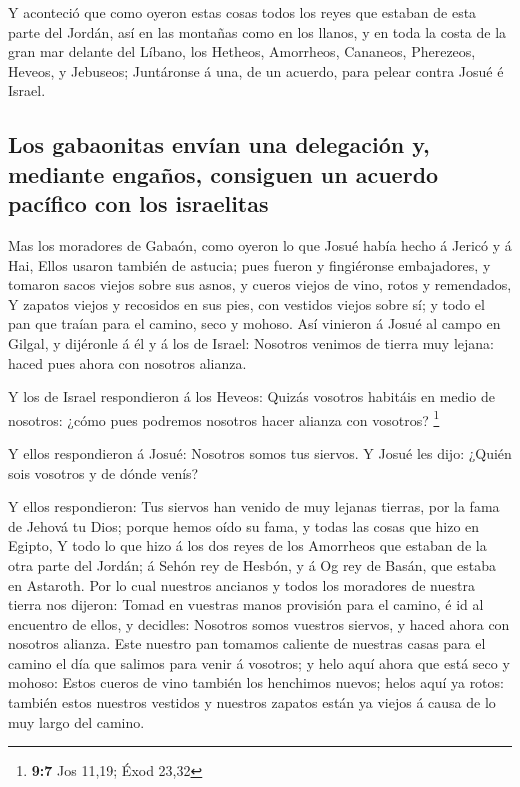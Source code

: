  Y aconteció que como oyeron estas cosas todos los reyes que
estaban de esta parte del Jordán, así en las montañas como en los
llanos, y en toda la costa de la gran mar delante del Líbano, los
Hetheos, Amorrheos, Cananeos, Pherezeos, Heveos, y Jebuseos;
 Juntáronse á una, de un acuerdo, para pelear contra Josué é
Israel.

\hypertarget{los-gabaonitas-envuxedan-una-delegaciuxf3n-y-mediante-engauxf1os-consiguen-un-acuerdo-pacuxedfico-con-los-israelitas}{%
\subsection{Los gabaonitas envían una delegación y, mediante engaños,
consiguen un acuerdo pacífico con los
israelitas}\label{los-gabaonitas-envuxedan-una-delegaciuxf3n-y-mediante-engauxf1os-consiguen-un-acuerdo-pacuxedfico-con-los-israelitas}}

 Mas los moradores de Gabaón, como oyeron lo que Josué había
hecho á Jericó y á Hai,  Ellos usaron también de astucia;
pues fueron y fingiéronse embajadores, y tomaron sacos viejos sobre sus
asnos, y cueros viejos de vino, rotos y remendados,  Y
zapatos viejos y recosidos en sus pies, con vestidos viejos sobre sí; y
todo el pan que traían para el camino, seco y mohoso.  Así
vinieron á Josué al campo en Gilgal, y dijéronle á él y á los de Israel:
Nosotros venimos de tierra muy lejana: haced pues ahora con nosotros
alianza.

 Y los de Israel respondieron á los Heveos: Quizás vosotros
habitáis en medio de nosotros: ¿cómo pues podremos nosotros hacer
alianza con vosotros? \footnote{\textbf{9:7} Jos 11,19; Éxod 23,32}

 Y ellos respondieron á Josué: Nosotros somos tus siervos. Y
Josué les dijo: ¿Quién sois vosotros y de dónde venís?

 Y ellos respondieron: Tus siervos han venido de muy lejanas
tierras, por la fama de Jehová tu Dios; porque hemos oído su fama, y
todas las cosas que hizo en Egipto,  Y todo lo que hizo á
los dos reyes de los Amorrheos que estaban de la otra parte del Jordán;
á Sehón rey de Hesbón, y á Og rey de Basán, que estaba en Astaroth.
 Por lo cual nuestros ancianos y todos los moradores de
nuestra tierra nos dijeron: Tomad en vuestras manos provisión para el
camino, é id al encuentro de ellos, y decidles: Nosotros somos vuestros
siervos, y haced ahora con nosotros alianza.  Este nuestro
pan tomamos caliente de nuestras casas para el camino el día que salimos
para venir á vosotros; y helo aquí ahora que está seco y mohoso:
 Estos cueros de vino también los henchimos nuevos; helos
aquí ya rotos: también estos nuestros vestidos y nuestros zapatos están
ya viejos á causa de lo muy largo del camino.

